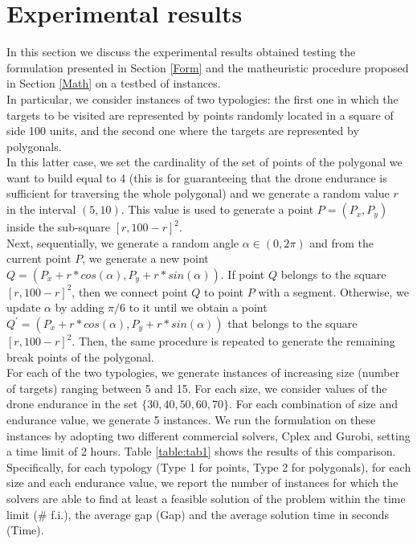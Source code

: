 \documentclass{itor}
\theoremstyle{definition}
\theoremstyle{remark}
\begin{document}


\section{Experimental results} \label{results}




In this section we discuss the experimental results obtained testing the formulation presented in Section \ref{Form} and the matheuristic procedure proposed in Section \ref{Math} on a testbed of instances.\\
In particular, we consider instances of two typologies: the first one in which the targets to be visited are represented by points randomly located in a square of side 100 units, and the second one where the targets are represented by polygonals.\\
In this latter case, we set the cardinality of the set of points of the polygonal we want to build equal to 4 (this is for guaranteeing that the drone endurance is sufficient for traversing the whole polygonal) and we generate a random value $r$ in the interval $(5, 10)$. This value is used to generate a point $P=(P_x, P_y)$ inside the sub-square $[r, 100-r]^2$.\\
Next, sequentially, we generate a random angle $\alpha \in (0,2\pi)$ and from the current point $P$, we generate a new point $Q=(P_x+r*cos(\alpha), P_y + r*sin(\alpha))$. If point $Q$ belongs to the square $[r, 100-r]^2$, then we connect point $Q$ to point $P$ with a segment. Otherwise, we update $\alpha$ by adding $\pi/6$ to it until we obtain a point $Q^{'}=(P_x+r*cos(\alpha), P_y + r*sin(\alpha))$ that belongs to the square $[r, 100-r]^2$.
Then, the same procedure is repeated to generate the remaining break points of the polygonal.\\
For each of the two typologies, we generate instances of increasing size (number of targets) ranging between 5 and 15. For each size, we consider values of the drone endurance in the set $\{30,40,50,60,70\}$. For each combination of size and endurance value, we generate 5 instances.
We run the formulation on these instances by adopting two different commercial solvers, Cplex and Gurobi, setting a time limit of 2 hours.
Table \ref{table:tab1} shows the results of this comparison. Specifically, for each typology (Type 1 for points, Type 2 for polygonals), for each size and each endurance value, we report the number of instances for which the solvers are able to find at least a feasible solution of the problem within the time limit (\# f.i.), the average gap (Gap) and the average solution time in seconds (Time).
\end{document}
